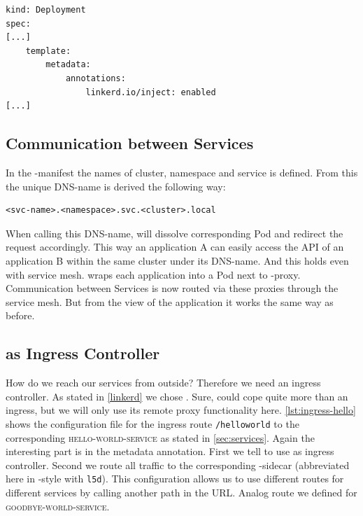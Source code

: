 \begin{lstlisting}[caption={Extract of a \kubernetes{}-manifest annotated by \textsc{Linkerd}.}, label={lst:linkerd-annotation}]
kind: Deployment
spec:
[...]
	template:
		metadata:
			annotations:
				linkerd.io/inject: enabled
[...]				
\end{lstlisting}
 
\subsection{Communication between Services}

In the \kubernetes{}-manifest the names of cluster, namespace and service is defined.
From this the unique DNS-name is derived the following way:

\begin{lstlisting}[caption={DNS-name of a local service in \kubernetes{}.}, label={lst:k8s-dns}]
<svc-name>.<namespace>.svc.<cluster>.local
\end{lstlisting}

When calling this DNS-name, \kubernetes{} will dissolve corresponding Pod and redirect the request accordingly.
This way an application A can easily access the API of an application B within the same cluster under its DNS-name.
And this holds even with service mesh.
\linkerd{} wraps each application into a Pod next to \linkerd{}-proxy.
Communication between Services is now routed via these proxies through the service mesh.
But from the view of the application it works the same way as before.

\subsection{\traefik{} as Ingress Controller}

How do we reach our services from outside?
Therefore we need an ingress controller.
As stated in \autoref{linkerd} we chose \traefik{}.
Sure, \traefik{} could cope quite more than an ingress, but we will only use its remote proxy functionality here.
\autoref{lst:ingress-hello} shows the configuration file for the ingress route \lstinline|/helloworld| to the corresponding \textsc{hello-world-service} as stated in \autoref{sec:services}.
Again the interesting part is in the metadata annotation.
First we tell \kubernetes{} to use \traefik{} as ingress controller.
Second we route all traffic to the corresponding \linkerd{}-sidecar (abbreviated here in \kubernetes{}-style with \lstinline|l5d|).
This configuration allows us to use different routes for different services by calling another path in the URL.
Analog route we defined for \textsc{goodbye-world-service}.

